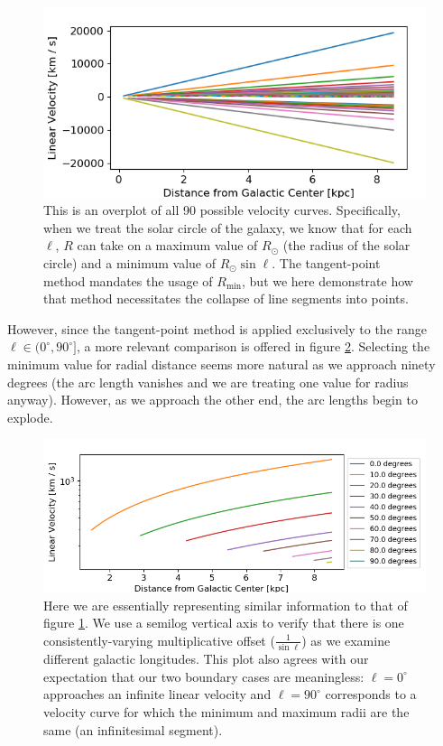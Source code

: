 \documentclass[12pt]{article}
\begin{document}
\begin{figure}
	\centering
	\includegraphics[width=.8\linewidth]{tangentPoint_dispersion}
	\caption{This is an overplot of all 90 possible velocity curves. Specifically, when we treat the solar circle of the galaxy, we know that for each $\ell$, $R$ can take on a maximum value of $R_\odot$ (the radius of the solar circle) and a minimum value of $R_\odot \sin \ell$. The tangent-point method mandates the usage of $R_\text{min}$, but we here demonstrate how that method necessitates the collapse of line segments into points.}
	\label{fig:TP_disp}
\end{figure}

However, since the tangent-point method is applied exclusively to the range $\ell \in (0^\circ, 90^\circ]$, a more relevant comparison is offered in figure \ref{fig:TP_sel_disp}. Selecting the minimum value for radial distance seems more natural as we approach ninety degrees (the arc length vanishes and we are treating one value for radius anyway). However, as we approach the other end, the arc lengths begin to explode.

\begin{figure}
	\centering
	\includegraphics[width=.9\linewidth]{tangentPoint_selected_dispersions}
	\caption{Here we are essentially representing similar information to that of figure \ref{fig:TP_disp}. We use a semilog vertical axis to verify that there is one consistently-varying multiplicative offset ($\frac{1}{\sin \ell}$) as we examine different galactic longitudes. This plot also agrees with our expectation that our two boundary cases are meaningless: $\ell = 0^\circ$ approaches an infinite linear velocity and $\ell = 90^\circ$ corresponds to a velocity curve for which the minimum and maximum radii are the same (an infinitesimal segment).}
	\label{fig:TP_sel_disp}
\end{figure}
\end{document}
